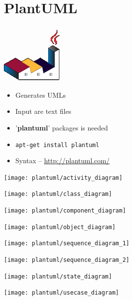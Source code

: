 \section{PlantUML}


{
\begin{center}
\includegraphics[scale=0.5]{pic/plantuml_logo}
\end{center}
\begin{itemize}
\item Generates UMLs
\item Input are text files
\item '\textbf{plantuml}' packages is needed
\item \texttt{apt-get install plantuml}
\item Syntax -- \url{http://plantuml.com/}
\end{itemize}
}


{
\begin{center}
\texttt{[image: plantuml/activity\_diagram]}
\end{center}
}


{
\begin{center}
\texttt{[image: plantuml/class\_diagram]}
\end{center}
}


{
\begin{center}
\texttt{[image: plantuml/component\_diagram]}
\end{center}
}


{
\begin{center}
\texttt{[image: plantuml/object\_diagram]}
\end{center}
}


{
\begin{center}
\texttt{[image: plantuml/sequence\_diagram\_1]}
\end{center}
}


{
\begin{center}
\texttt{[image: plantuml/sequence\_diagram\_2]}
\end{center}
}


{
\begin{center}
\texttt{[image: plantuml/state\_diagram]}
\end{center}
}


{
\begin{center}
\texttt{[image: plantuml/usecase\_diagram]}
\end{center}
}
